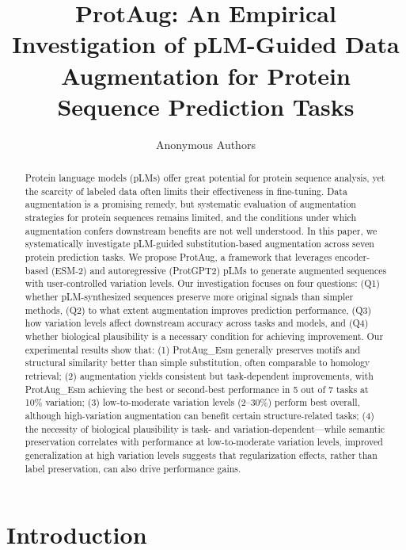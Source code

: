 \documentclass{article}
\title{ProtAug: An Empirical Investigation of pLM-Guided Data Augmentation for Protein Sequence Prediction Tasks}
\author{Anonymous Authors}
\begin{document}
\maketitle

\begin{abstract}
    Protein language models (pLMs) offer great potential for protein sequence analysis, yet the scarcity of labeled data often limits their effectiveness in fine-tuning. Data augmentation is a promising remedy, but systematic evaluation of augmentation strategies for protein sequences remains limited, and the conditions under which augmentation confers downstream benefits are not well understood. In this paper, we systematically investigate pLM-guided substitution-based augmentation across seven protein prediction tasks. We propose ProtAug, a framework that leverages encoder-based (ESM-2) and autoregressive (ProtGPT2) pLMs to generate augmented sequences with user-controlled variation levels. Our investigation focuses on four questions: (Q1) whether pLM-synthesized sequences preserve more original signals than simpler methods, (Q2) to what extent augmentation improves prediction performance, (Q3) how variation levels affect downstream accuracy across tasks and models, and (Q4) whether biological plausibility is a necessary condition for achieving improvement. Our experimental results show that: (1) ProtAug\_Esm generally preserves motifs and structural similarity better than simple substitution, often comparable to homology retrieval; (2) augmentation yields consistent but task-dependent improvements, with ProtAug\_Esm achieving the best or second-best performance in 5 out of 7 tasks at 10\% variation; (3) low-to-moderate variation levels (2–30\%) perform best overall, although high-variation augmentation can benefit certain structure-related tasks; (4) the necessity of biological plausibility is task- and variation-dependent—while semantic preservation correlates with performance at low-to-moderate variation levels, improved generalization at high variation levels suggests that regularization effects, rather than label preservation, can also drive performance gains.
\end{abstract}

\section{Introduction}
\end{document}
